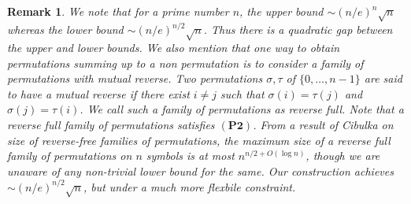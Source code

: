 \documentclass[12pt]{article}
\newtheorem{remark}[defn]{{\bf Remark}}
\begin{document}
\begin{remark}{\rm
We note that for a prime number $n$, the upper bound $\sim
(n/e)^n\sqrt{n}$
whereas the lower bound $\sim (n/e)^{n/2}\sqrt{n}$. Thus there is a quadratic
gap between the upper and lower bounds. We also mention that one way to
obtain permutations summing up to a non permutation is to consider a family
of permutations with mutual reverse. Two permutations $\sigma,\tau$ of
$\{0,\ldots,n-1\}$ are said to have a {\em mutual reverse} if there exist
$i\neq j$ such that $\sigma(i)=\tau(j)$ and $\sigma(j)=\tau(i)$. We call
such a family of permutations as {\em reverse full}. Note that
a reverse full family of permutations satisfies
$\mathbf{(P2)}$. From a result of Cibulka \cite{cibulka} on size of
reverse-free families of permutations, the maximum size of a reverse full
family of permutations on $n$ symbols is at most $n^{n/2+O(\log n)}$,
though we are unaware of any non-trivial lower bound for the same. Our
construction achieves $\sim (n/e)^{n/2}\sqrt{n}$, but under a much more
flexbile constraint.
}
\end{remark}
\end{document}
